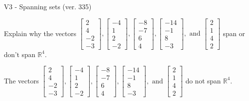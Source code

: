 \begin{exercise}
  \begin{exerciseTitle}V3 - Spanning sets (ver. 335)\end{exerciseTitle}
  \begin{exerciseStatement}
    Explain why the vectors \(\left[\begin{array}{r}
2 \\
4 \\
-2 \\
-3
\end{array}\right] , \left[\begin{array}{r}
-4 \\
1 \\
2 \\
-2
\end{array}\right] , \left[\begin{array}{r}
-8 \\
-7 \\
6 \\
4
\end{array}\right] , \left[\begin{array}{r}
-14 \\
-1 \\
8 \\
-3
\end{array}\right] , \text{ and } \left[\begin{array}{r}
2 \\
1 \\
4 \\
2
\end{array}\right]\) span or don't span \(\mathbb{R}^4\). 
	


  \end{exerciseStatement}
  \begin{exerciseAnswer}
   The vectors \(\left[\begin{array}{r}
2 \\
4 \\
-2 \\
-3
\end{array}\right] , \left[\begin{array}{r}
-4 \\
1 \\
2 \\
-2
\end{array}\right] , \left[\begin{array}{r}
-8 \\
-7 \\
6 \\
4
\end{array}\right] , \left[\begin{array}{r}
-14 \\
-1 \\
8 \\
-3
\end{array}\right] , \text{ and } \left[\begin{array}{r}
2 \\
1 \\
4 \\
2
\end{array}\right]\) 
  	 do not  
	span \(\mathbb{R}^4\).
  



\end{exerciseAnswer}
\end{exercise}

